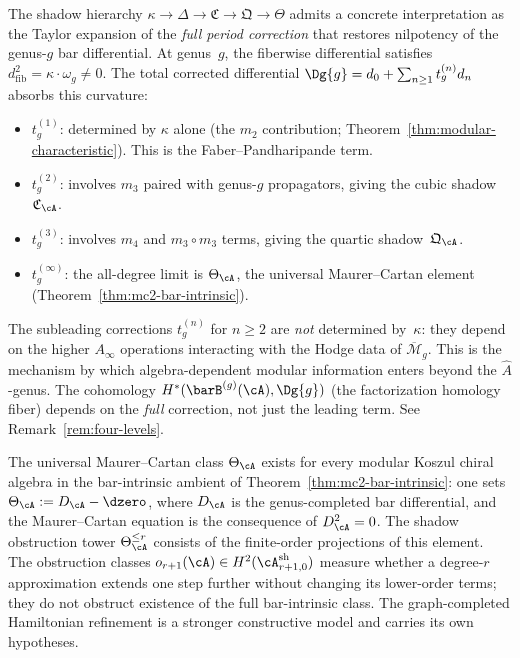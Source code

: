 \begin{remark}%
\label{rem:shadow-period-correction}%
%
The shadow hierarchy $\kappa \to \Delta \to \mathfrak{C}
\to \mathfrak{Q} \to \Theta$ admits a concrete interpretation
as the Taylor expansion of the \emph{full period correction}
that restores nilpotency of the genus-$g$ bar differential.
At genus~$g$, the fiberwise differential satisfies
$d_{\mathrm{fib}}^2 = \kappa \cdot \omega_g \neq 0$.
The total corrected differential
$\Dg{g} = d_0 + \sum_{n \geq 1} t_g^{(n)} d_n$
absorbs this curvature:
\begin{itemize}
\item $t_g^{(1)}$: determined by $\kappa$ alone (the $m_2$
 contribution; Theorem~\ref{thm:modular-characteristic}).
 This is the Faber--Pandharipande term.
\item $t_g^{(2)}$: involves $m_3$ paired with genus-$g$
 propagators, giving the cubic shadow~$\mathfrak{C}_{\cA}$.
\item $t_g^{(3)}$: involves $m_4$ and $m_3 \circ m_3$ terms,
 giving the quartic shadow~$\mathfrak{Q}_{\cA}$.
\item $t_g^{(\infty)}$: the all-degree limit is
 $\Theta_{\cA}$, the universal Maurer--Cartan element
 (Theorem~\ref{thm:mc2-bar-intrinsic}).
\end{itemize}
The subleading corrections $t_g^{(n)}$ for $n \geq 2$ are
\emph{not} determined by~$\kappa$: they depend on the
higher $A_\infty$ operations interacting with the Hodge data of
$\overline{\mathcal{M}}_g$. This is the mechanism by which
algebra-dependent modular information enters beyond the
$\hat{A}$-genus. The cohomology
$H^*(\barB^{(g)}(\cA), \Dg{g})$ (the factorization homology
fiber) depends on the \emph{full} correction, not just the
leading term. See Remark~\ref{rem:four-levels}.
\end{remark}

The universal Maurer--Cartan class $\Theta_\cA$ exists for every
modular Koszul chiral algebra in the bar-intrinsic ambient of
Theorem~\ref{thm:mc2-bar-intrinsic}: one sets
$\Theta_\cA:=D_\cA-\dzero$, where $D_\cA$ is the genus-completed bar
differential, and the Maurer--Cartan equation is the consequence of
$D_\cA^2=0$. The shadow obstruction tower
$\Theta_\cA^{\leq r}$ consists of the finite-order projections of this
element. The obstruction classes
$o_{r+1}(\cA)\in H^2(\cA^{\mathrm{sh}}_{r+1,0})$ measure whether a
degree-$r$ approximation extends one step further without changing its
lower-order terms; they do not obstruct existence of the full
bar-intrinsic class. The graph-completed Hamiltonian refinement is a
stronger constructive model and carries its own hypotheses.

